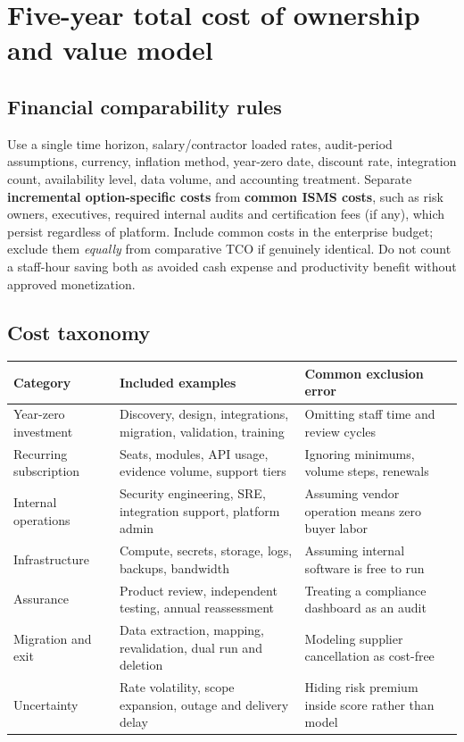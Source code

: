 \documentclass[10pt,letterpaper]{article}
\begin{document}
\section{Five-year total cost of ownership and value model}\label{sec:finance}
\subsection{Financial comparability rules}
Use a single time horizon, salary/contractor loaded rates, audit-period assumptions, currency, inflation method, year-zero date, discount rate, integration count, availability level, data volume, and accounting treatment. Separate \textbf{incremental option-specific costs} from \textbf{common ISMS costs}, such as risk owners, executives, required internal audits and certification fees (if any), which persist regardless of platform. Include common costs in the enterprise budget; exclude them \emph{equally} from comparative TCO if genuinely identical. Do not count a staff-hour saving both as avoided cash expense and productivity benefit without approved monetization.

\subsection{Cost taxonomy}

\begin{tabularx}{\linewidth}{@{}L{1.27in}L{2.65in}Y@{}}
\toprule
\textbf{Category} & \textbf{Included examples} & \textbf{Common exclusion error}\\\midrule
Year-zero investment & Discovery, design, integrations, migration, validation, training & Omitting staff time and review cycles\\
Recurring subscription & Seats, modules, API usage, evidence volume, support tiers & Ignoring minimums, volume steps, renewals\\
Internal operations & Security engineering, SRE, integration support, platform admin & Assuming vendor operation means zero buyer labor\\
Infrastructure & Compute, secrets, storage, logs, backups, bandwidth & Assuming internal software is free to run\\
Assurance & Product review, independent testing, annual reassessment & Treating a compliance dashboard as an audit\\
Migration and exit & Data extraction, mapping, revalidation, dual run and deletion & Modeling supplier cancellation as cost-free\\
Uncertainty & Rate volatility, scope expansion, outage and delivery delay & Hiding risk premium inside score rather than model\\
\bottomrule
\end{tabularx}
\end{document}
